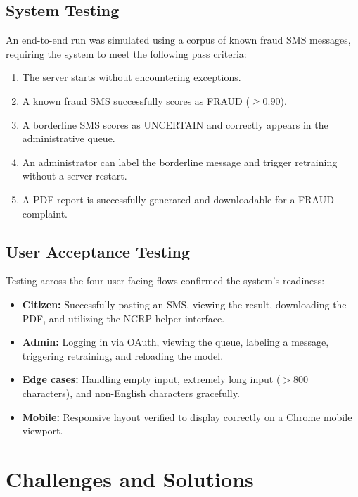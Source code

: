 \subsection{System Testing}
An end-to-end run was simulated using a corpus of known fraud SMS messages, requiring the system to meet the following pass criteria:
\begin{enumerate}
    \item The server starts without encountering exceptions.
    \item A known fraud SMS successfully scores as FRAUD ($\geq 0.90$).
    \item A borderline SMS scores as UNCERTAIN and correctly appears in the administrative queue.
    \item An administrator can label the borderline message and trigger retraining without a server restart.
    \item A PDF report is successfully generated and downloadable for a FRAUD complaint.
\end{enumerate}

\subsection{User Acceptance Testing}
Testing across the four user-facing flows confirmed the system's readiness:
\begin{itemize}
    \item \textbf{Citizen:} Successfully pasting an SMS, viewing the result, downloading the PDF, and utilizing the NCRP helper interface.
    \item \textbf{Admin:} Logging in via OAuth, viewing the queue, labeling a message, triggering retraining, and reloading the model.
    \item \textbf{Edge cases:} Handling empty input, extremely long input ($>800$ characters), and non-English characters gracefully.
    \item \textbf{Mobile:} Responsive layout verified to display correctly on a Chrome mobile viewport.
\end{itemize}

\section{Challenges and Solutions}

